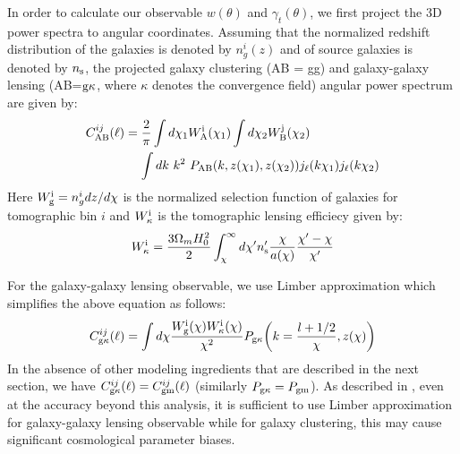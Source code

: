 \documentclass[fleqn,usenatbib]{mnras}
\newcommand{\gammat}{\ensuremath{\gamma_{t}(\theta)}}
\newcommand{\wtheta}{\ensuremath{w(\theta)}}
\begin{document}
In order to calculate our observable $\wtheta$ and $\gammat$, we first project the 3D power spectra to angular coordinates. Assuming that the normalized redshift distribution of the galaxies is denoted by $n^{i}_g(z)$ and of source galaxies is denoted by $n_{\rm s}$, the projected galaxy clustering (AB = gg) and galaxy-galaxy lensing (AB=${\rm g\kappa}$, where $\kappa$ denotes the convergence field) angular power spectrum are given by:
\begin{align}\label{eq:Cl_exact}
    C^{ij}_{\rm AB}(\ell) &= \frac{2}{\pi} \int d\chi_1 W^{\rm i}_{\rm A}(\chi_1) \int d\chi_2 W^{\rm j}_{\rm B}(\chi_2) \nonumber \\
    &\mathrel{\phantom{=}} \int dk \ k^2 \ P_{\rm AB}(k,z(\chi_1),z(\chi_2)) j_{\ell}(k \chi_1) j_{\ell}(k \chi_2)
\end{align}
Here $W^{\rm i}_{\rm g} = n^{i}_g dz/d\chi$ is the normalized selection function of galaxies for tomographic bin $i$ and $W^{\rm i}_{\rm \kappa}$ is the tomographic lensing efficiecy given by:
\begin{equation}
    W^{\rm i}_{\rm \kappa} = \frac{3\Omega_m H_0^2}{2} \int_{\chi}^{\infty} d\chi' n'_{\rm s} \frac{\chi}{a(\chi)}\frac{\chi' - \chi}{\chi'}
\end{equation}


For the galaxy-galaxy lensing observable, we use Limber approximation which simplifies the above equation as follows:
\begin{equation}\label{eq:Cl_limber}
    C^{ij}_{\rm g\kappa}(\ell)  = \int d\chi \frac{W^{\rm i}_{\rm g}(\chi) W^{\rm i}_{\rm \kappa}(\chi)}{\chi^2} P_{\rm g\kappa}\bigg(k=\frac{l + 1/2}{\chi},z(\chi)\bigg) 
\end{equation}
In the absence of other modeling ingredients that are described in the next section, we have $C^{ij}_{\rm g\kappa}(\ell) = C^{ij}_{\rm gm}(\ell)$ (similarly $P_{\rm g\kappa} = P_{\rm gm}$). As described in \citet{Fang_nonlimber}, even at the accuracy beyond this analysis, it is sufficient to use Limber approximation for galaxy-galaxy lensing observable while for galaxy clustering, this may cause significant cosmological parameter biases. 
\end{document}
